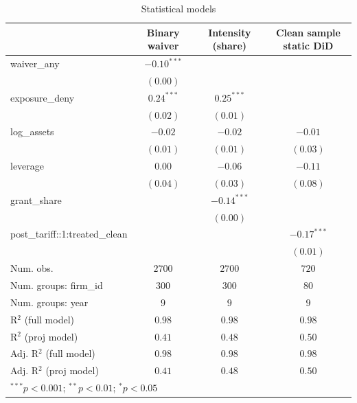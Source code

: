 
\begin{table}
\begin{center}
\begin{tabular}{l c c c}
\hline
 & Binary waiver & Intensity (share) & Clean sample static DiD \\
\hline
waiver\_any                    & $-0.10^{***}$ &               &               \\
                               & $(0.00)$      &               &               \\
exposure\_deny                 & $0.24^{***}$  & $0.25^{***}$  &               \\
                               & $(0.02)$      & $(0.01)$      &               \\
log\_assets                    & $-0.02$       & $-0.02$       & $-0.01$       \\
                               & $(0.01)$      & $(0.01)$      & $(0.03)$      \\
leverage                       & $0.00$        & $-0.06$       & $-0.11$       \\
                               & $(0.04)$      & $(0.03)$      & $(0.08)$      \\
grant\_share                   &               & $-0.14^{***}$ &               \\
                               &               & $(0.00)$      &               \\
post\_tariff::1:treated\_clean &               &               & $-0.17^{***}$ \\
                               &               &               & $(0.01)$      \\
\hline
Num. obs.                      & $2700$        & $2700$        & $720$         \\
Num. groups: firm\_id          & $300$         & $300$         & $80$          \\
Num. groups: year              & $9$           & $9$           & $9$           \\
R$^2$ (full model)             & $0.98$        & $0.98$        & $0.98$        \\
R$^2$ (proj model)             & $0.41$        & $0.48$        & $0.50$        \\
Adj. R$^2$ (full model)        & $0.98$        & $0.98$        & $0.98$        \\
Adj. R$^2$ (proj model)        & $0.41$        & $0.48$        & $0.50$        \\
\hline
\multicolumn{4}{l}{\scriptsize{$^{***}p<0.001$; $^{**}p<0.01$; $^{*}p<0.05$}}
\end{tabular}
\caption{Statistical models}
\label{table:coefficients}
\end{center}
\end{table}
